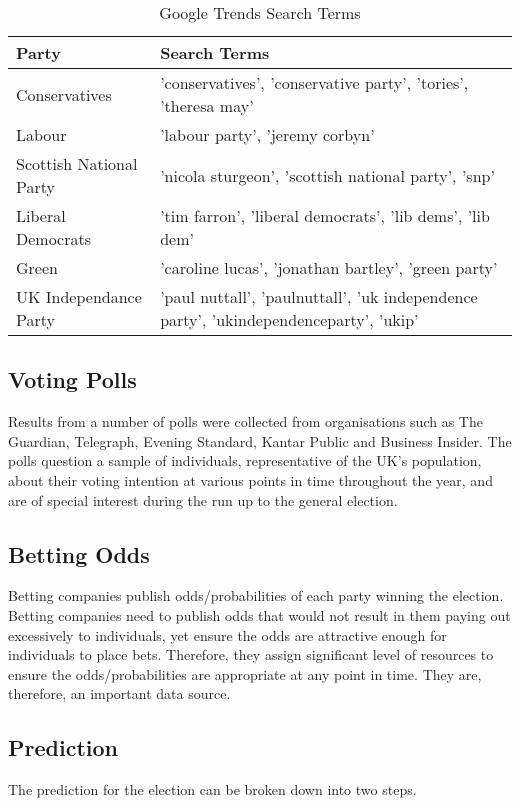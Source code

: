 \documentclass{article}
\begin{document}
\begin{table}[h]
\caption{Google Trends Search Terms}
\begin{tabular}{|p{2.5cm}|p{9cm}|} \hline
\textbf{Party} & \textbf{Search Terms} \\ \hline
Conservatives & 'conservatives', 'conservative party', 'tories', 'theresa may'\\ \hline
Labour & 'labour party', 'jeremy corbyn'\\ \hline
Scottish National Party & 'nicola sturgeon', 'scottish national party', 'snp'\\ \hline
Liberal Democrats & 'tim farron', 'liberal democrats', 'lib dems', 'lib dem'\\ \hline
Green & 'caroline lucas', 'jonathan bartley', 'green party'\\ \hline
UK Independance Party & 'paul nuttall', 'paulnuttall', 'uk independence party', 'ukindependenceparty', 'ukip'\\ \hline
\end{tabular}
\end{table}


\subsection{Voting Polls}
Results from a number of polls were collected from organisations such as The Guardian, Telegraph, Evening Standard, Kantar Public and Business Insider. The polls question a sample of individuals, representative of the UK's population, about their voting intention at various points in time throughout the year, and are of special interest during the run up to the general election.

\subsection{Betting Odds}

Betting companies publish odds/probabilities of each party winning the election. Betting companies need to publish odds that would not result in them paying out excessively to individuals, yet ensure the odds are attractive enough for individuals to place bets. Therefore, they assign significant level of resources to ensure the odds/probabilities are appropriate at any point in time. They are, therefore, an important data source.

\subsection{Prediction}
The prediction for the election can be broken down into two steps.\\
\end{document}
